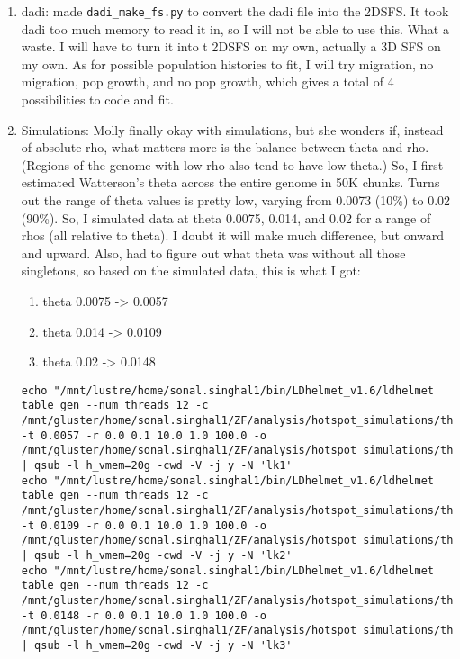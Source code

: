 \documentclass[idxtotoc,hyperref,openany,oneside]{labbook} %
\begin{document}
\begin{enumerate}
\item dadi: made \verb+dadi_make_fs.py+ to convert the dadi file into the 2DSFS. It took dadi too much memory to read it in, so I will not be able to use this. What a waste. I will have to turn it into t 2DSFS on my own, actually a 3D SFS on my own. As for possible population histories to fit, I will try migration, no migration, pop growth, and no pop growth, which gives a total of 4 possibilities to code and fit.
\item Simulations: Molly finally okay with simulations, but she wonders if, instead of absolute rho, what matters more is the balance between theta and rho. (Regions of the genome with low rho also tend to have low theta.) So, I first estimated Watterson's theta across the entire genome in 50K chunks. Turns out the range of theta values is pretty low, varying from 0.0073 (10\%) to 0.02 (90\%). So, I simulated data at theta 0.0075, 0.014, and 0.02 for a range of rhos (all relative to theta). I doubt it will make much difference, but onward and upward. Also, had to figure out what theta was without all those singletons, so based on the simulated data, this is what I got:
\begin{enumerate}
\item theta 0.0075 -> 0.0057
\item theta 0.014 -> 0.0109
\item theta 0.02 -> 0.0148
\end{enumerate}
\begin{verbatim}
echo "/mnt/lustre/home/sonal.singhal1/bin/LDhelmet_v1.6/ldhelmet table_gen --num_threads 12 -c /mnt/gluster/home/sonal.singhal1/ZF/analysis/hotspot_simulations/theta_rho/simulation_theta0.0075.conf -t 0.0057 -r 0.0 0.1 10.0 1.0 100.0 -o /mnt/gluster/home/sonal.singhal1/ZF/analysis/hotspot_simulations/theta_rho/simulation_theta0.0075.lk" | qsub -l h_vmem=20g -cwd -V -j y -N 'lk1'
echo "/mnt/lustre/home/sonal.singhal1/bin/LDhelmet_v1.6/ldhelmet table_gen --num_threads 12 -c /mnt/gluster/home/sonal.singhal1/ZF/analysis/hotspot_simulations/theta_rho/simulation_theta0.014.conf -t 0.0109 -r 0.0 0.1 10.0 1.0 100.0 -o /mnt/gluster/home/sonal.singhal1/ZF/analysis/hotspot_simulations/theta_rho/simulation_theta0.014.lk" | qsub -l h_vmem=20g -cwd -V -j y -N 'lk2'
echo "/mnt/lustre/home/sonal.singhal1/bin/LDhelmet_v1.6/ldhelmet table_gen --num_threads 12 -c /mnt/gluster/home/sonal.singhal1/ZF/analysis/hotspot_simulations/theta_rho/simulation_theta0.02.conf -t 0.0148 -r 0.0 0.1 10.0 1.0 100.0 -o /mnt/gluster/home/sonal.singhal1/ZF/analysis/hotspot_simulations/theta_rho/simulation_theta0.02.lk" | qsub -l h_vmem=20g -cwd -V -j y -N 'lk3'

\end{verbatim}
\end{enumerate}
\end{document}
